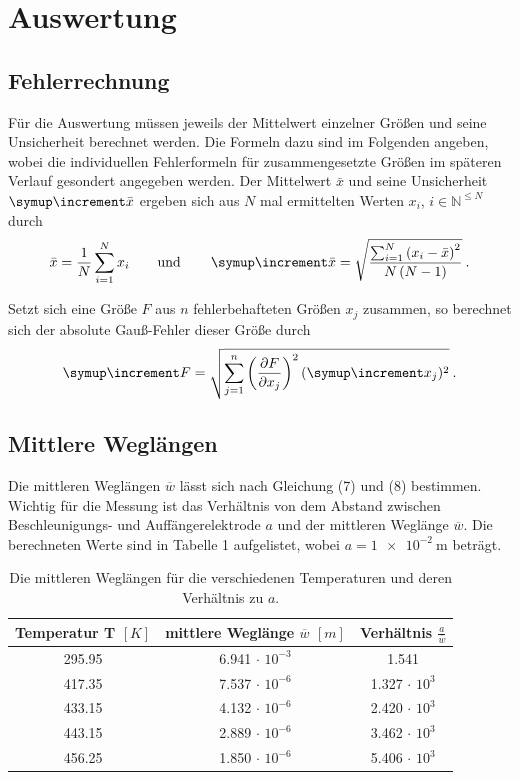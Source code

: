 \section{Auswertung}

\subsection{Fehlerrechnung}
Für die Auswertung müssen jeweils der Mittelwert einzelner Größen und seine Unsicherheit berechnet werden.
Die Formeln dazu sind im Folgenden angeben, wobei die individuellen Fehlerformeln für zusammengesetzte Größen im späteren Verlauf gesondert angegeben werden. 
Der Mittelwert $\bar{x}$ und seine Unsicherheit $\Del{\bar{x}}$ ergeben sich aus $N$ mal ermittelten Werten $x_i$, $i \in \mathbb{N}^{\leq N}$ durch
\begin{equation}
  \label{eq:mean}
  \bar{x} = \frac{1}{N} \sum_{i=1}^{N} x_i \qquad \text{und} \qquad \Del{\bar{x}} = \sqrt{ \frac{\sum_{i=1}^{N} \left( x_i - \bar{x} \right)^2}{N\,(N-1)}} \: .
\end{equation}

Setzt sich eine Größe $F$ aus $n$ fehlerbehafteten Größen $x_j$ zusammen, so berechnet sich der absolute Gauß-Fehler dieser Größe durch
\begin{equation}
  \label{eq:Gauss}
  \Del{F} = \sqrt{\sum_{j=1}^{n} \left( \frac{\partial F}{\partial x_j} \right)^2 (\Del{x_j})^2} \: .
\end{equation}

\subsection{Mittlere Weglängen}
Die mittleren Weglängen $\overline{w}$ lässt sich nach Gleichung (7) und (8) bestimmen.
Wichtig für die Messung ist das Verhältnis von dem Abstand zwischen Beschleunigungs- und Auffängerelektrode $a$ und der mittleren Weglänge $\overline{w}$.
Die berechneten Werte sind in Tabelle 1 aufgelistet, wobei $a = \SI{1 e-2}{\metre}$ beträgt.
\begin{table}[H]
    \begin{center}
      \begin{tabular}{c|c|c}
        \textbf{Temperatur T $[K]$} & \textbf{mittlere Weglänge $\overline{w}$ $[m]$} & \textbf{Verhältnis $\frac{a}{\overline{w}}$}\\
        \hline
        295.95 & 6.941 $\cdot$ $10^{-3}$ & 1.541 \\
        417.35 & 7.537 $\cdot$ $10^{-6}$ & 1.327 $\cdot$ $10^{3}$ \\
        433.15 & 4.132 $\cdot$ $10^{-6}$ & 2.420 $\cdot$ $10^{3}$ \\
        443.15 & 2.889 $\cdot$ $10^{-6}$ & 3.462 $\cdot$ $10^{3}$ \\
        456.25 & 1.850 $\cdot$ $10^{-6}$ & 5.406 $\cdot$ $10^{3}$ 
      \end{tabular}
      \caption{Die mittleren Weglängen für die verschiedenen Temperaturen und deren Verhältnis zu $a$.}
       \label{tab:mitt}
    \end{center}
\end{table}

